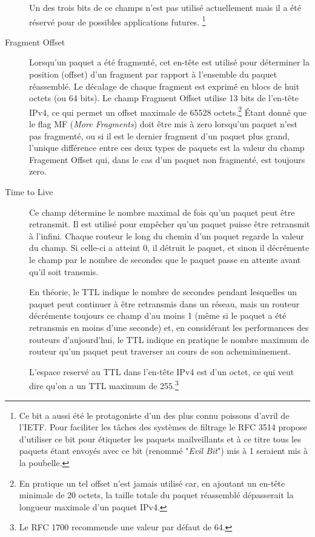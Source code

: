 \begin{description}
Un des trois bits de ce champs n'est pas utilisé actuellement mais il a été
réservé pour de possibles applications futures.
\footnote {Ce bit a aussi été le protagoniste d'un des plus connu poissons
d'avril de l'IETF. Pour faciliter les tâches des systèmes de filtrage 
le RFC 3514 propose d'utiliser ce bit pour étiqueter les paquets mailveillants et à ce
titre tous les paquets étant envoyés avec ce bit (renommé "{\it Evil Bit}") 
mis à 1 seraient mis à la poubelle.}

\item [Fragment Offset]
Lorsqu'un paquet a été fragmenté, cet en-tête est utilisé pour déterminer la
position (offset) d'un fragment par rapport à l'ensemble du paquet réassemblé.
Le décalage de chaque fragment est exprimé en blocs de huit octets (ou 64
bits). Le champ Fragment Offset utilise 13 bits de l'en-tête IPv4, ce qui permet
un offset maximale de 65528 octets.\footnote {En pratique un tel offset n'est
jamais utilisé car, en ajoutant un en-tête minimale de 20 octets, la taille
totale du paquet réassemblé dépasserait la longueur maximale d'un paquet IPv4.}
Étant donné que le flag MF ({\it More Fragments}) doit être mis à zero lorsqu'un paquet 
n'est pas fragmenté, ou si il est le dernier fragment d'un paquet plus grand, 
l'unique différence entre ces deux types de paquets est la valeur du 
champ Fragement Offset qui, dans le cas d'un paquet non fragmenté, est
toujours zero.

\item [Time to Live]
Ce champ détermine le nombre maximal de fois qu'un paquet peut être retransmit. 
Il est utilisé pour empêcher qu'un paquet puisse être retransmit à l'infini.
Chaque routeur le long du chemin d'un paquet regarde la valeur du champ. Si celle-ci
a atteint 0, il détruit le paquet, et sinon il décrémente le champ par le
nombre de secondes que le paquet passe en attente avant qu'il soit transmis.

En théorie, le TTL indique le nombre de secondes pendant lesquelles un paquet
peut continuer à être retransmis dans un réseau, mais un routeur 
 décrémente toujours ce champ d'au moins 1 (même si le paquet a été
retransmis en moins d'une seconde) et, en considérant les performances des routeurs
d'aujourd'hui, le TTL indique en pratique le nombre maximum de routeur qu'un paquet
 peut traverser au cours de son achemiminement.

L'espace reservé au TTL dans l'en-tête IPv4 est d'un octet, ce qui veut dire qu'on a un 
TTL maximum de 255.\footnote {Le RFC 1700 recommende une valeur par défaut de 64.}


\end{description}
